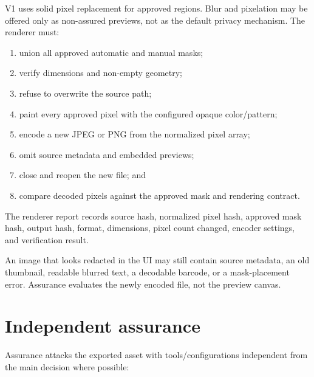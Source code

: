 V1 uses solid pixel replacement for approved regions. Blur and pixelation may be offered only as non-assured previews, not as the default privacy mechanism. The renderer must:

\begin{enumerate}[leftmargin=7mm]
  \item union all approved automatic and manual masks;
  \item verify dimensions and non-empty geometry;
  \item refuse to overwrite the source path;
  \item paint every approved pixel with the configured opaque color/pattern;
  \item encode a new JPEG or PNG from the normalized pixel array;
  \item omit source metadata and embedded previews;
  \item close and reopen the new file; and
  \item compare decoded pixels against the approved mask and rendering contract.
\end{enumerate}

The renderer report records source hash, normalized pixel hash, approved mask hash, output hash, format, dimensions, pixel count changed, encoder settings, and verification result.

\begin{warningbox}
An image that looks redacted in the UI may still contain source metadata, an old thumbnail, readable blurred text, a decodable barcode, or a mask-placement error. Assurance evaluates the newly encoded file, not the preview canvas.
\end{warningbox}

\section{Independent assurance}

Assurance attacks the exported asset with tools/configurations independent from the main decision where possible:

